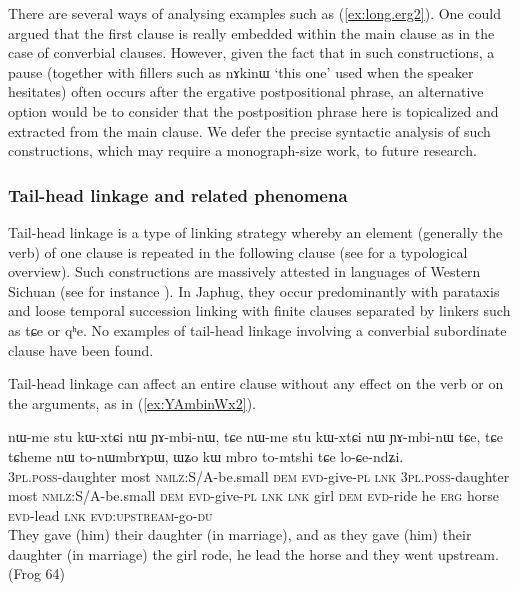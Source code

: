 \documentclass[oldfontcommands,oneside,a4paper,11pt]{article}
\newcommand{\ipa}[1]{{\phon \mbox{#1}}} %
\newcommand{\refb}[1]{(\ref{#1})}
\begin{document}
There are several ways of analysing examples such as \refb{ex:long.erg2}. One could argued that the first clause is really embedded within the main clause as in the case of converbial clauses. However, given the fact that in such constructions, a pause (together with fillers such as \ipa{nɤkinɯ} `this one' used when the speaker hesitates) often occurs after the ergative postpositional phrase, an alternative option would be to consider that the postposition phrase here is topicalized and extracted from the main clause. We defer the precise syntactic analysis of such constructions, which may require a monograph-size work, to future research.

\subsubsection{Tail-head linkage and related phenomena}
Tail-head linkage is a type of linking strategy whereby an element (generally the verb) of one clause  is repeated in the following clause (see \citealt{vries05tailhead} for a typological overview). Such constructions are massively attested in languages of Western Sichuan (see for instance \citealt[688-693]{zhangsh13ersu}). In Japhug, they occur predominantly with parataxis and loose temporal succession linking with finite clauses separated by linkers such as \ipa{tɕe} or \ipa{qʰe}. No examples of tail-head linkage involving a converbial subordinate clause have been found.

Tail-head linkage can affect an entire clause without any effect on the verb or on the arguments, as  in \refb{ex:YAmbinWx2}.

\begin{exe}
\ex \label{ex:YAmbinWx2}
\gll
\ipa{nɯ-me} 	\ipa{stu} 	\ipa{kɯ-xtɕi} 	\ipa{nɯ} 	\ipa{ɲɤ-mbi-nɯ,} 	\ipa{tɕe} 	\ipa{nɯ-me} 	\ipa{stu} 	\ipa{kɯ-xtɕi} 	\ipa{nɯ} 	\ipa{ɲɤ-mbi-nɯ} 	\ipa{tɕe,} 	\ipa{tɕe} 	\ipa{tɕheme} 	\ipa{nɯ} 	\ipa{to-nɯmbrɤpɯ,} 	\ipa{ɯʑo} 	\ipa{kɯ} 	\ipa{mbro} 	\ipa{to-mtshi} 	\ipa{tɕe} 	\ipa{lo-ɕe-ndʑi.} \\
\textsc{3pl.poss}-daughter most \textsc{nmlz}:S/A-be.small \textsc{dem} \textsc{evd}-give-\textsc{pl}  \textsc{lnk} \textsc{3pl.poss}-daughter most \textsc{nmlz}:S/A-be.small \textsc{dem} \textsc{evd}-give-\textsc{pl}  \textsc{lnk}  \textsc{lnk} girl \textsc{dem} \textsc{evd}-ride he \textsc{erg} horse \textsc{evd}-lead \textsc{lnk} \textsc{evd:upstream}-go-\textsc{du} \\
\glt They gave (him) their daughter (in marriage), and as they gave (him) their daughter (in marriage)  the girl rode, he lead the horse and they went upstream. (Frog 64)
\end{exe}
\end{document}
